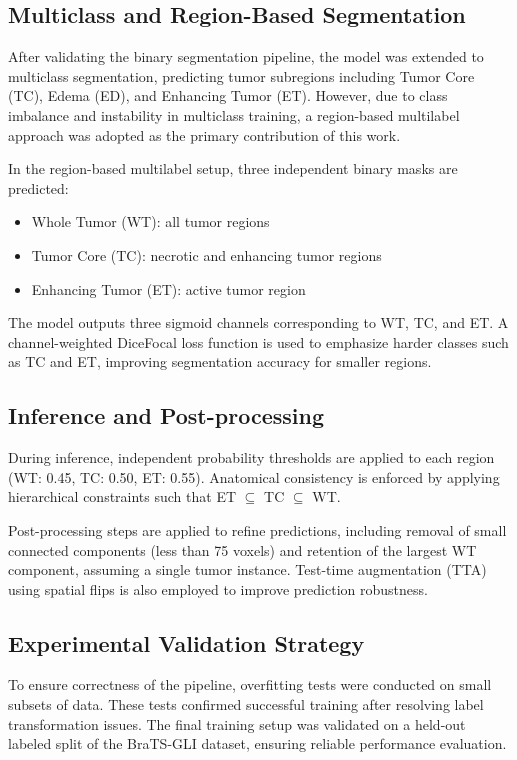 \documentclass[conference]{IEEEtran}
\begin{document}
\subsection{Multiclass and Region-Based Segmentation}

After validating the binary segmentation pipeline, the model was extended to multiclass segmentation, predicting tumor subregions including Tumor Core (TC), Edema (ED), and Enhancing Tumor (ET). However, due to class imbalance and instability in multiclass training, a region-based multilabel approach was adopted as the primary contribution of this work.

In the region-based multilabel setup, three independent binary masks are predicted:
\begin{itemize}
\item Whole Tumor (WT): all tumor regions
\item Tumor Core (TC): necrotic and enhancing tumor regions
\item Enhancing Tumor (ET): active tumor region
\end{itemize}

The model outputs three sigmoid channels corresponding to WT, TC, and ET. A channel-weighted DiceFocal loss function is used to emphasize harder classes such as TC and ET, improving segmentation accuracy for smaller regions.

\subsection{Inference and Post-processing}

During inference, independent probability thresholds are applied to each region (WT: 0.45, TC: 0.50, ET: 0.55). Anatomical consistency is enforced by applying hierarchical constraints such that ET $\subseteq$ TC $\subseteq$ WT.

Post-processing steps are applied to refine predictions, including removal of small connected components (less than 75 voxels) and retention of the largest WT component, assuming a single tumor instance. Test-time augmentation (TTA) using spatial flips is also employed to improve prediction robustness.

\subsection{Experimental Validation Strategy}

To ensure correctness of the pipeline, overfitting tests were conducted on small subsets of data. These tests confirmed successful training after resolving label transformation issues. The final training setup was validated on a held-out labeled split of the BraTS-GLI dataset, ensuring reliable performance evaluation.
\end{document}
